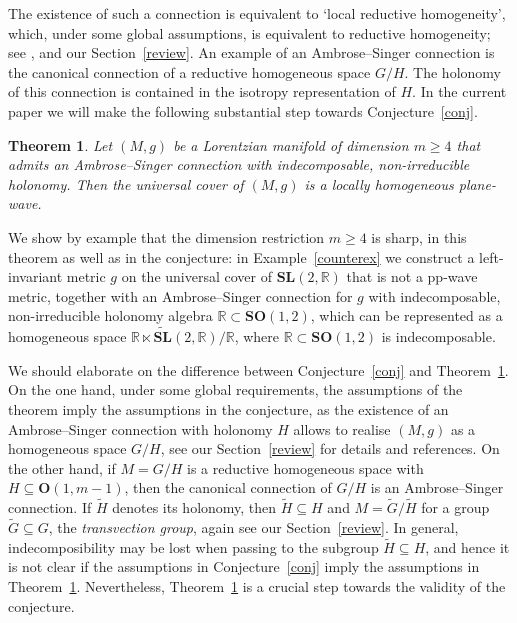 \documentclass[11pt,a4paper]{amsart}
\newcommand{\+}{\oplus}
\newcommand{\SO}{\mathbf{SO}}
\renewcommand{\O}{\mathbf{O}}
\newcommand{\SL}{\mathbf{SL}}
\newcommand{\1}{\mathbf{1}}
\newcommand{\R}{\mathbb{R}} %
\newcommand{\<}{\langle}
\renewcommand{\>}{\rangle}
\theoremstyle{definition}
\theoremstyle{plain}
\newtheorem{theorem}[definition]{Theorem}
\numberwithin{equation}{section}
\begin{document}
The existence of such a connection is equivalent to `local reductive homogeneity',  which,  under some global assumptions, is equivalent to reductive homogeneity; see \cite{AmbroseSinger58,tricerri-vanhecke83,GadeaOubina92}, and our Section~\ref{review}. An example of an Ambrose--Singer connection is the canonical connection of a reductive homogeneous space $G/H$. The holonomy of this connection is contained in the isotropy representation of $H$.
In the current paper we will make the following substantial step towards Conjecture~\ref{conj}.
\begin{theorem}\label{maintheo}
Let $(M,g)$ be a Lorentzian manifold of dimension $m\ge 4$  that admits an Ambrose--Singer connection with indecomposable, non-irreducible holonomy. Then the universal cover of $(M,g)$ is a locally homogeneous plane-wave.
\end{theorem}
We show by  example that the dimension restriction $m\ge 4$ is sharp, in this theorem as well as in the conjecture: in Example~\ref{counterex} we construct  
a left-invariant metric $g$ 
on the universal cover of $\SL(2,\R)$ that is not a pp-wave metric, together with an Ambrose--Singer connection for $g$ with indecomposable, non-irreducible holonomy algebra $\R\subset \SO(1,2)$, which can be represented as a homogeneous space $\R\ltimes \widetilde{\SL}(2,\R)/\R$, where $\R\subset \SO(1,2)$ is indecomposable.


We should elaborate on the difference between Conjecture~\ref{conj} and Theorem~\ref{maintheo}. 
On the one hand, under some global requirements, the assumptions of the theorem  imply the assumptions in the conjecture, as the existence of an Ambrose--Singer connection with holonomy $H$ allows to realise  $(M,g)$ as a homogeneous space $G/H$, see our Section~\ref{review} for details and references.  On the other hand, if $M=G/H$ is a reductive homogeneous space with  $H\subseteq \O(1,m-1)$, then the canonical connection of $G/H$ is an Ambrose--Singer connection. If $\widetilde{H}$ denotes its holonomy, then $\widetilde{H}\subseteq H$ and $M=\widetilde{G}/\widetilde{H}$ for a group $\widetilde{G}\subseteq G$, the {\em transvection group}, again see our Section~\ref{review}. In general,  indecomposibility may be lost when passing to the subgroup $\widetilde{H}\subseteq H$, and hence it is not clear if the assumptions in Conjecture~\ref{conj}  imply the assumptions in Theorem~\ref{maintheo}.  Nevertheless, Theorem~\ref{maintheo} is a crucial step towards the validity of the conjecture.  
\end{document}

